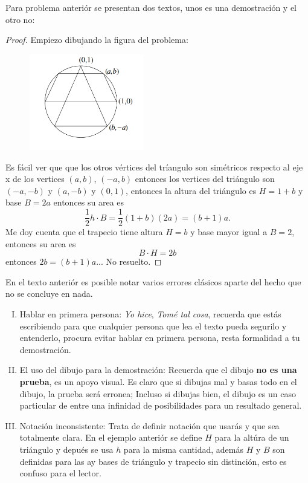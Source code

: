 \documentclass[a4paper,openright,10pt]{book}
\numberwithin{equation}{section}
\theoremstyle{definition}
\theoremstyle{definition}
\begin{document}
\begin{itemize}
\begin{ejm}
\end{ejm}
Para problema anteriór se presentan dos textos, unos es una demostración y el otro no:

\begin{proof}
Empiezo dibujando la figura del problema:
\begin{figure}[!h]
	\centering
	{\includegraphics[width=50mm]{ejempl1.png}}
\end{figure}


Es fácil ver que que los otros vértices del tríangulo son simétricos respecto al eje x de los vertices $(a,b)$, $(-a,b)$ entonces los vertices del triángulo son  $(-a,-b)$ y $(a,-b)$ y $(0,1)$, entonces la altura del triángulo es $H=1+b$ y base $B=2a$ entonces su area es 
$$\frac{1}{2}h \cdot B =\frac{1}{2}(1+b)(2a)=(b+1)a.$$
Me doy cuenta que el trapecio tiene altura $H=b$ y base mayor igual a $B=2$, entonces su area es 
$$B \cdot H = 2b$$
entonces $2b = (b+1)a $... No resuelto.
\end{proof}
En el texto anteriór es posible notar varios errores clásicos aparte del hecho que no se concluye en nada. 

\begin{enumerate}[I)]
\item Hablar en primera persona: \textit{Yo hice}, \textit{Tomé tal cosa}, recuerda que estás escribiendo para que cualquier persona que lea el texto pueda segurilo y entenderlo, procura evitar hablar en primera persona, resta formalidad a tu demostración.

\item El uso del dibujo para la demostración: Recuerda que el dibujo \textbf{no es una prueba}, es un apoyo visual. Es claro que si dibujas mal y basas todo en el dibujo, la prueba será erronea;  Incluso si dibujas bien, el dibujo es un caso particular de entre una infinidad de posibilidades para un resultado general. 

\item Notación inconsistente: Trata de definir notación que usarás y que sea totalmente clara. En el ejemplo anteriór se define $H$ para la altúra de un triángulo y depués se usa $h$ para la misma cantidad, además $H$ y $B$ son definidas para las ay bases de triángulo y trapecio sin distinción, esto es confuso para el lector.


\end{enumerate}
\end{itemize}
\end{document}

